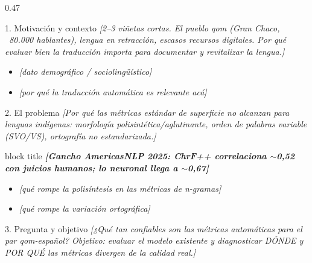 \documentclass[final]{beamer}
\newcommand{\ph}[1]{{\color{ph}\itshape [#1]}}
\newcommand{\highlightbox}[1]{%
  \begin{beamercolorbox}[sep=0.6cm,rounded=true]{block title}%
    \centering\bfseries #1%
  \end{beamercolorbox}%
}
\begin{document}
\begin{frame}[t]
\begin{columns}[t]
\begin{column}{0.47\paperwidth}
  \begin{block}{1. Motivación y contexto}
    \ph{2--3 viñetas cortas. El pueblo qom (Gran Chaco, ~80.000 hablantes),
        lengua en retracción, escasos recursos digitales. Por qué evaluar
        bien la traducción importa para documentar y revitalizar la lengua.}
    \begin{itemize}
      \item \ph{dato demográfico / sociolingüístico}
      \item \ph{por qué la traducción automática es relevante acá}
    \end{itemize}
  \end{block}

  \begin{block}{2. El problema}
    \ph{Por qué las métricas estándar de superficie no alcanzan para lenguas
        indígenas: morfología polisintética/aglutinante, orden de palabras
        variable (SVO/VS), ortografía no estandarizada.}
    \vspace{0.5cm}
    \highlightbox{\ph{Gancho AmericasNLP 2025: ChrF++ correlaciona $\sim$0{,}52 con
      juicios humanos; lo neuronal llega a $\sim$0{,}67}}
    \vspace{0.4cm}
    \begin{itemize}
      \item \ph{qué rompe la polisíntesis en las métricas de n-gramas}
      \item \ph{qué rompe la variación ortográfica}
    \end{itemize}
  \end{block}

  \begin{block}{3. Pregunta y objetivo}
    \ph{¿Qué tan confiables son las métricas automáticas para el par
        qom-español? Objetivo: evaluar el modelo existente y diagnosticar
        DÓNDE y POR QUÉ las métricas divergen de la calidad real.}
  \end{block}


\end{column}
\end{columns}
\end{frame}
\end{document}
